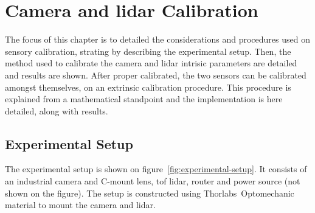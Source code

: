 \chapter{Camera and \acs{lidar} Calibration}
\label{chapter:calibration}

The focus of this chapter is to detailed the considerations and procedures used on sensory calibration, strating by describing the experimental setup. Then, the method used to calibrate the camera and \ac{lidar} intrisic parameters are detailed and results are shown. After proper calibrated, the two sensors can be calibrated amongst themselves, on an extrinsic calibration procedure. This procedure is explained from a mathematical standpoint and the implementation is here detailed, along with results.


\section{Experimental Setup}
The experimental setup is shown on figure~\ref{fig:experimental-setup}. It consists of an industrial camera and C-mount lens, \ac{tof} \ac{lidar}, router and power source (not shown on the figure). The setup is constructed using Thorlabs\cp~Optomechanic material to mount the camera and \ac{lidar}.

